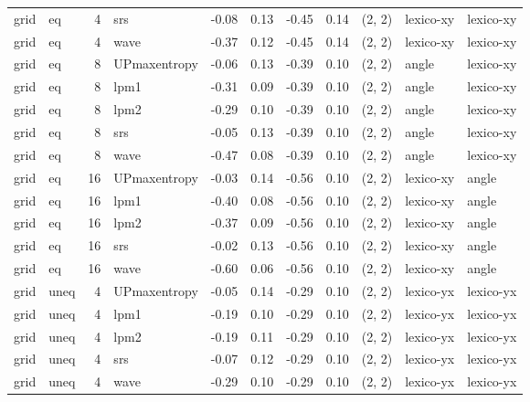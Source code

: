 \begin{tabular}{llrlrrrrlll}
  grid &    eq &  4 &          srs & -0.08 &     0.13 &  -0.45 &       0.14 & (2, 2) &   lexico-xy &  lexico-xy \\
  grid &    eq &  4 &         wave & -0.37 &     0.12 &  -0.45 &       0.14 & (2, 2) &   lexico-xy &  lexico-xy \\
  grid &    eq &  8 & UPmaxentropy & -0.06 &     0.13 &  -0.39 &       0.10 & (2, 2) &     angle &  lexico-xy \\
  grid &    eq &  8 &         lpm1 & -0.31 &     0.09 &  -0.39 &       0.10 & (2, 2) &     angle &  lexico-xy \\
  grid &    eq &  8 &         lpm2 & -0.29 &     0.10 &  -0.39 &       0.10 & (2, 2) &     angle &  lexico-xy \\
  grid &    eq &  8 &          srs & -0.05 &     0.13 &  -0.39 &       0.10 & (2, 2) &     angle &  lexico-xy \\
  grid &    eq &  8 &         wave & -0.47 &     0.08 &  -0.39 &       0.10 & (2, 2) &     angle &  lexico-xy \\
  grid &    eq & 16 & UPmaxentropy & -0.03 &     0.14 &  -0.56 &       0.10 & (2, 2) &   lexico-xy &    angle \\
  grid &    eq & 16 &         lpm1 & -0.40 &     0.08 &  -0.56 &       0.10 & (2, 2) &   lexico-xy &    angle \\
  grid &    eq & 16 &         lpm2 & -0.37 &     0.09 &  -0.56 &       0.10 & (2, 2) &   lexico-xy &    angle \\
  grid &    eq & 16 &          srs & -0.02 &     0.13 &  -0.56 &       0.10 & (2, 2) &   lexico-xy &    angle \\
  grid &    eq & 16 &         wave & -0.60 &     0.06 &  -0.56 &       0.10 & (2, 2) &   lexico-xy &    angle \\
  grid &  uneq &  4 & UPmaxentropy & -0.05 &     0.14 &  -0.29 &       0.10 & (2, 2) &   lexico-yx &  lexico-yx \\
  grid &  uneq &  4 &         lpm1 & -0.19 &     0.10 &  -0.29 &       0.10 & (2, 2) &   lexico-yx &  lexico-yx \\
  grid &  uneq &  4 &         lpm2 & -0.19 &     0.11 &  -0.29 &       0.10 & (2, 2) &   lexico-yx &  lexico-yx \\
  grid &  uneq &  4 &          srs & -0.07 &     0.12 &  -0.29 &       0.10 & (2, 2) &   lexico-yx &  lexico-yx \\
  grid &  uneq &  4 &         wave & -0.29 &     0.10 &  -0.29 &       0.10 & (2, 2) &   lexico-yx &  lexico-yx \\

\end{tabular}
